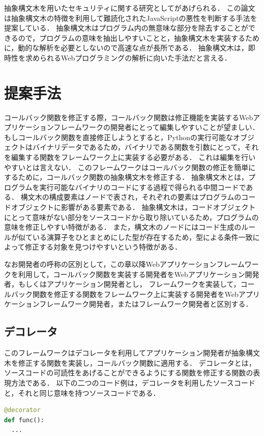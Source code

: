 \documentclass[submit]{ipsj}
\begin{document}
抽象構文木を用いたセキュリティに関する研究として\cite{ast_js}があげられる．
この論文は抽象構文木の特徴を利用して難読化されたJavaScriptの悪性を判断する手法を提案している．
抽象構文木はプログラム内の無意味な部分を除去することができるので，プログラムの意味を抽出しやすいことと，抽象構文木を実装するために，動的な解析を必要としないので高速な点が長所である．
抽象構文木は，即時性を求められるWebプログラミングの解析に向いた手法だと言える．

\section{提案手法}
コールバック関数を修正する際，コールバック関数は修正機能を実装するWebアプリケーションフレームワークの開発者にとって編集しやすいことが望ましい．
もしコールバック関数を直接修正しようとすると，Pythonの実行可能なオブジェクトはバイナリデータであるため，バイナリである関数を引数にとって，それを編集する関数をフレームワーク上に実装する必要がある．
これは編集を行いやすいとは言えない．
このフレームワークはコールバック関数の修正を簡単にするために，コールバック関数の抽象構文木を修正する．
抽象構文木とは，プログラムを実行可能なバイナリのコードにする過程で得られる中間コードである．
構文木の構成要素はノードで表され，それぞれの要素はプログラムのコードオブジェクトに影響がある要素である．
抽象構文木は，コードオブジェクトにとって意味がない部分をソースコードから取り除いているため，プログラムの意味を修正しやすい特徴がある．
また，構文木のノードにはコード生成のルールが似ている演算子をひとまとめにした型が存在するため，型による条件一致によって修正する対象を見つけやすいという特徴がある．

なお開発者の呼称の区別として，この章以降Webアプリケーションフレームワークを利用して，コールバック関数を実装する開発者をWebアプリケーション開発者，もしくはアプリケーション開発者とし，
フレームワークを実装して，コールバック関数を修正する関数をフレームワーク上に実装する開発者をWebアプリケーションフレームワーク開発者，またはフレームワーク開発者と区別する．
\subsection{デコレータ}
このフレームワークはデコレータ\cite{decorator}を利用してアプリケーション開発者が抽象構文木を修正する関数を実装し，コールバック関数に適用する．
デコレータとは，ソースコードの可読性をあげることができるようにする関数を修正する関数の表現方法である．
以下の二つのコード例は，デコレータを利用したソースコードと，それと同じ意味を持つソースコードである．
\begin{lstlisting}[language=python]
@decorator
def func():
  ...
\end{lstlisting}
\end{document}
